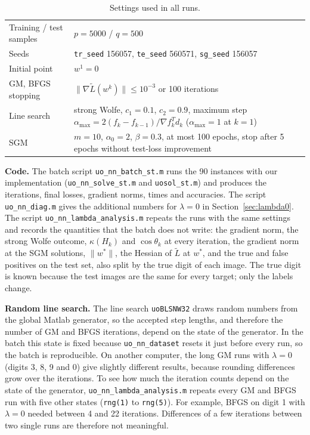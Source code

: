 \documentclass{article}
\begin{document}
\begin{table}[h]
\centering
\small
\begin{tabular}{lp{10.5cm}}
\toprule
Training / test samples & $p=5000$ / $q=500$ \\
Seeds & \texttt{tr\_seed} 156057, \texttt{te\_seed} 560571, \texttt{sg\_seed} 156057 \\
Initial point & $w^1=0$ \\
GM, BFGS stopping & $\|\nabla\tilde L(w^k)\|\le 10^{-3}$ or 100 iterations \\
Line search & strong Wolfe, $c_1=0.1$, $c_2=0.9$, maximum step $\alpha_{\max}=2(f_k-f_{k-1})/\nabla f_k^{T}d_k$ ($\alpha_{\max}=1$ at $k=1$) \\
SGM & $m=10$, $\alpha_0=2$, $\beta=0.3$, at most 100 epochs, stop after 5 epochs without test-loss improvement \\
\bottomrule
\end{tabular}
\caption{Settings used in all runs.}
\label{tab:setup}
\end{table}

\textbf{Code.} The batch script \texttt{uo\_nn\_\allowbreak batch\_st.m} runs the 90 instances with our implementation (\texttt{uo\_nn\_\allowbreak solve\_st.m} and \texttt{uosol\_st.m}) and produces the iterations, final losses, gradient norms, times and accuracies. The script \texttt{uo\_nn\_\allowbreak diag.m} gives the additional numbers for $\lambda=0$ in Section~\ref{sec:lambda0}. The script \texttt{uo\_nn\_\allowbreak lambda\_\allowbreak analysis.m} repeats the runs with the same settings and records the quantities that the batch does not write: the gradient norm, the strong Wolfe outcome, $\kappa(H_k)$ and $\cos\theta_k$ at every iteration, the gradient norm at the SGM solutions, $\|w^*\|$, the Hessian of $\tilde L$ at $w^*$, and the true and false positives on the test set, also split by the true digit of each image. The true digit is known because the test images are the same for every target; only the labels change.

\textbf{Random line search.} The line search \texttt{uoBLSNW32} draws random numbers from the global Matlab generator, so the accepted step lengths, and therefore the number of GM and BFGS iterations, depend on the state of the generator. In the batch this state is fixed because \texttt{uo\_nn\_dataset} resets it just before every run, so the batch is reproducible. On another computer, the long GM runs with $\lambda=0$ (digits 3, 8, 9 and 0) give slightly different results, because rounding differences grow over the iterations. To see how much the iteration counts depend on the state of the generator, \texttt{uo\_nn\_\allowbreak lambda\_\allowbreak analysis.m} repeats every GM and BFGS run with five other states (\texttt{rng(1)} to \texttt{rng(5)}). For example, BFGS on digit 1 with $\lambda=0$ needed between 4 and 22 iterations. Differences of a few iterations between two single runs are therefore not meaningful.
\end{document}
